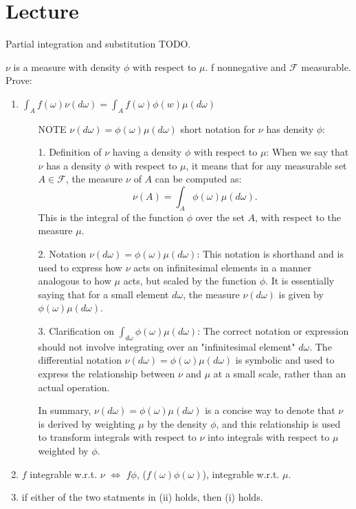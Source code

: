 \section{Lecture}%
\label{sec:Lecture}

Partial integration and substitution TODO.

\begin{exercise}[9.6]
    \label{ex:9.6}
    $\nu$ is a measure with density $\phi$ with respect to $\mu$.
    f nonnegative and $\mathcal{F}$ measurable.
    Prove:
    \begin{enumerate}[label=(\roman*)]
        \item $\int_A f(\omega) \nu(d\omega) = \int_{A} f(\omega) \phi(w)\mu(d\omega)$
        \begin{enumerate}
            \item[NOTE] $\nu(d\omega) = \phi(\omega)\mu(d\omega)$ short notation for $\nu$ has density $\phi$:

            1. Definition of $\nu$ having a density $\phi$ with respect to $\mu$: When we say that $\nu$ has a 
            density $\phi$ with respect to $\mu$, it means that for any measurable set $A \in \mathcal{F}$, 
            the measure $\nu$ of $A$ can be computed as:
               \[
               \nu(A) = \int_A \phi(\omega) \mu(d\omega).
               \]
               This is the integral of the function $\phi$ over the set $A$, with respect to the measure $\mu$. 

            2. Notation $\nu(d\omega) = \phi(\omega)\mu(d\omega)$: This notation is shorthand and is used to express 
            how $\nu$ acts on infinitesimal elements in a manner analogous to how $\mu$ acts, but scaled by the function 
            $\phi$. It is essentially saying that for a small element $d\omega$, 
            the measure $\nu(d\omega)$ is given by $\phi(\omega)\mu(d\omega)$.

            3. Clarification on $\int_{d\omega} \phi(\omega)\mu(d\omega)$: 
            The correct notation or expression should not involve integrating over an "infinitesimal element" $d\omega$. 
            The differential notation $\nu(d\omega) = \phi(\omega)\mu(d\omega)$ is symbolic and used to express 
            the relationship between $\nu$ and $\mu$ at a small scale, rather than an actual operation.

            In summary, $\nu(d\omega) = \phi(\omega)\mu(d\omega)$ is a concise way to denote that $\nu$ is derived by 
            weighting $\mu$ by the density $\phi$, and this relationship is used to transform integrals with respect to $\nu$ 
            into integrals with respect to $\mu$ weighted by $\phi$.
        \end{enumerate}
        \item $f$ integrable w.r.t. $\nu$ $\iff$ $f \phi$, ($f(\omega)\phi(\omega)$), integrable w.r.t. $\mu$.
        \item if either of the two statments in (ii) holds, then (i) holds.
    \end{enumerate}


\end{exercise}
